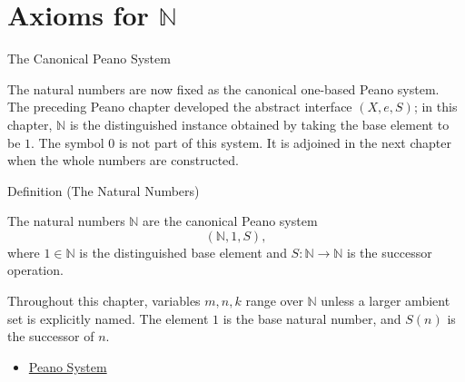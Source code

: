 \section{Axioms for \texorpdfstring{$\mathbb{N}$}{N}}
\label{sec:nz-axioms}

\begin{topicbox}{The Canonical Peano System}
\begin{exposition}
The natural numbers are now fixed as the canonical one-based Peano system.
The preceding Peano chapter developed the abstract interface $(X,e,S)$; in
this chapter, $\mathbb{N}$ is the distinguished instance obtained by taking
the base element to be $1$. The symbol $0$ is not part of this system. It is
adjoined in the next chapter when the whole numbers are constructed.
\end{exposition}

\begin{definitionbox}{Definition (The Natural Numbers)}
\begin{definition}
\label{def:natural-numbers}
The natural numbers $\mathbb{N}$ are the canonical Peano system
\[
(\mathbb{N},1,S),
\]
where $1 \in \mathbb{N}$ is the distinguished base element and
$S:\mathbb{N}\to\mathbb{N}$ is the successor operation.
\end{definition}
\end{definitionbox}

\begin{remark*}
Throughout this chapter, variables $m,n,k$ range over $\mathbb{N}$ unless a
larger ambient set is explicitly named. The element $1$ is the base natural
number, and $S(n)$ is the successor of $n$.
\end{remark*}

\begin{dependencies}
\begin{itemize}
  \item \hyperref[def:peano-system]{Peano System}
\end{itemize}
\end{dependencies}
\end{topicbox}

